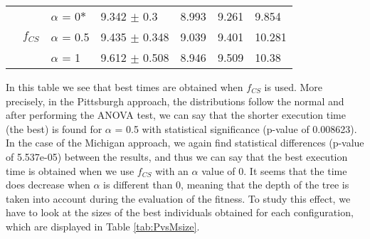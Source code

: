 \begin{table*}
{\begin{tabular}{lll|l|l|l|l|}
		\multicolumn{1}{|l|}{}                                                                                                   & \multicolumn{1}{l|}{\multirow{3}{*}{$f_{CS}$}} & $\alpha$ = 0\textbf{$*$}   & 9.342 $\pm$ 0.3    & 8.993  & 9.261  & 9.854  \\ \cline{3-7} 
		\multicolumn{1}{|l|}{}                                                                                                   & \multicolumn{1}{l|}{}                          & $\alpha$ = 0.5 & 9.435 $\pm$ 0.348  & 9.039  & 9.401  & 10.281 \\ \cline{3-7} 
		\multicolumn{1}{|l|}{}                                                                                                   & \multicolumn{1}{l|}{}                          & $\alpha$ = 1   & 9.612 $\pm$ 0.508  & 8.946  & 9.509  & 10.38  \\ \hline
	\end{tabular}
}
	\label{tab:PvsMtime}
\end{table*}

In this table we see that best times are obtained when $f_{CS}$ is used. More precisely, in the Pittsburgh approach, the distributions follow the normal and after performing the ANOVA test, we can say that the shorter execution time (the best) is found for $\alpha$ = 0.5 with statistical significance (p-value of 0.008623). In the case of the Michigan approach, we again find statistical differences (p-value of 5.537e-05) between the results, and thus we can say that the best execution time is obtained when we use $f_{CS}$ with an $\alpha$ value of 0. It seems that the time does decrease when $\alpha$ is different than 0, meaning that the depth of the tree is taken into account during the evaluation of the fitness. To study this effect, we have to look at the sizes of the best individuals obtained for each configuration, which are displayed in Table \ref{tab:PvsMsize}.

